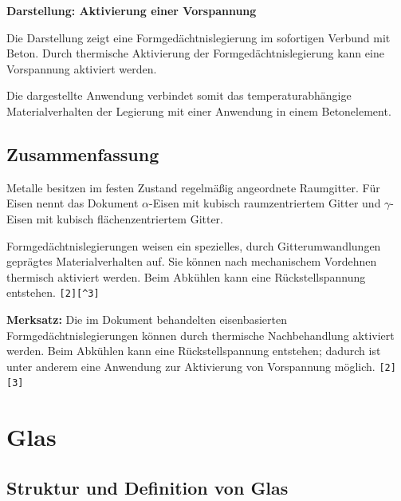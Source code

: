 \documentclass[
  12pt,
  a4paper,
  oneside
]{scrreprt}
\newcommand{\quelle}[1]{\hfill\texttt{#1}}
\begin{document}
\begin{darstellungsbox}
\textbf{Darstellung: Aktivierung einer Vorspannung}

Die Darstellung zeigt eine Formgedächtnislegierung im sofortigen
Verbund mit Beton. Durch thermische Aktivierung der
Formgedächtnislegierung kann eine Vorspannung aktiviert werden.

Die dargestellte Anwendung verbindet somit das temperaturabhängige
Materialverhalten der Legierung mit einer Anwendung in einem
Betonelement.
\end{darstellungsbox}

\section{Zusammenfassung}

Metalle besitzen im festen Zustand regelmäßig angeordnete Raumgitter.
Für Eisen nennt das Dokument $\alpha$-Eisen mit kubisch
raumzentriertem Gitter und $\gamma$-Eisen mit kubisch
flächenzentriertem Gitter. 

Formgedächtnislegierungen weisen ein spezielles, durch
Gitterumwandlungen geprägtes Materialverhalten auf. Sie können nach
mechanischem Vordehnen thermisch aktiviert werden. Beim Abkühlen kann
eine Rückstellspannung entstehen. \quelle{[2][^3]}

\begin{merksatzbox}
\textbf{Merksatz:}
Die im Dokument behandelten eisenbasierten Formgedächtnislegierungen
können durch thermische Nachbehandlung aktiviert werden. Beim Abkühlen
kann eine Rückstellspannung entstehen; dadurch ist unter anderem eine
Anwendung zur Aktivierung von Vorspannung möglich.
\quelle{[2][3]}
\end{merksatzbox}

\chapter{Glas}

\section{Struktur und Definition von Glas}
\end{document}

